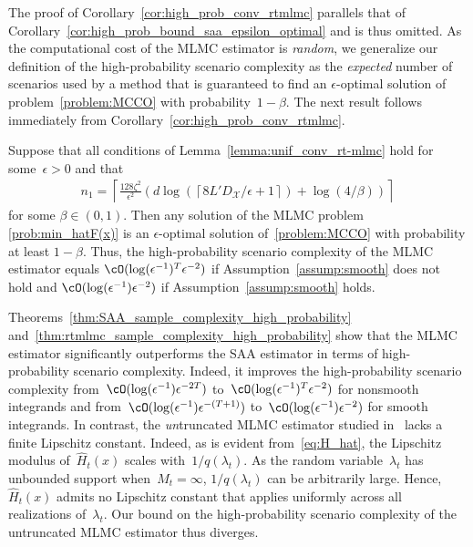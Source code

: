 \documentclass[11pt]{article}
\let\hat\widehat
\begin{document}
The proof of Corollary~\ref{cor:high_prob_conv_rtmlmc} parallels that of Corollary~\ref{cor:high_prob_bound_saa_epsilon_optimal} and is thus omitted. As the computational cost of the MLMC estimator is {\em random}, we generalize our definition of the high-probability scenario complexity as the
{\em expected} number of scenarios used by a method that is guaranteed to find an $\epsilon$-optimal solution of problem~\eqref{problem:MCCO} with probability~$1-\beta$. The next result follows immediately from Corollary~\ref{cor:high_prob_conv_rtmlmc}. 


\begin{theorem}
    \label{thm:rtmlmc_sample_complexity_high_probability}
  Suppose that all conditions of Lemma~\ref{lemma:unif_conv_rt-mlmc} hold for some~$\epsilon>0$ and that
    \begin{align*}
    n_1 =\left\lceil \frac{128\zeta^2}{\epsilon^2} \left(d \log\left( \left\lceil8L' D_\mathcal{X}/\epsilon +1\right\rceil\right) + \log\left(4/\beta \right) \right) \right\rceil
\end{align*}
for some $\beta\in(0,1)$. Then any solution of the MLMC problem \eqref{prob:min_hatF(x)} is an $\epsilon$-optimal solution of~\eqref{problem:MCCO} with probability at least $1-\beta$. Thus, the high-probability scenario complexity of the MLMC estimator equals $\cO(\log(\epsilon^{-1})^{T}\epsilon^{-2})$ if Assumption~\ref{assump:smooth} does not hold and $\cO(\log(\epsilon^{-1})\epsilon^{-2})$ if Assumption~\ref{assump:smooth} holds.
\end{theorem}


Theorems~\ref{thm:SAA_sample_complexity_high_probability} and~\ref{thm:rtmlmc_sample_complexity_high_probability} show that the MLMC estimator significantly outperforms the SAA estimator in terms of high-probability scenario complexity. Indeed, it improves the high-probability scenario complexity from~$\cO(\log(\epsilon^{-1})\epsilon^{-2T})$ to~$\cO(\log(\epsilon^{-1})^{T}\epsilon^{-2})$ for nonsmooth integrands and from~$\cO(\log(\epsilon^{-1})\epsilon^{-(T+1)})$ to~$\cO(\log(\epsilon^{-1})\epsilon^{-2})$ for smooth integrands. In contrast, the \emph{un}truncated MLMC estimator studied in~\cite{syed2023optimal} lacks a finite Lipschitz constant. Indeed, as is evident from~\eqref{eq:H_hat}, the Lipschitz modulus of~$\hat{H}_t(x)$ scales with~$1/q(\lambda_t)$. As the random variable~$\lambda_t$ has unbounded support when~$M_t=\infty$, $1/q(\lambda_t)$ can be arbitrarily large. Hence, $\hat{H}_t(x)$ admits no Lipschitz constant that applies uniformly across all realizations of~$\lambda_t$. Our bound on the high-probability scenario complexity of the untruncated MLMC estimator thus diverges.
\end{document}
